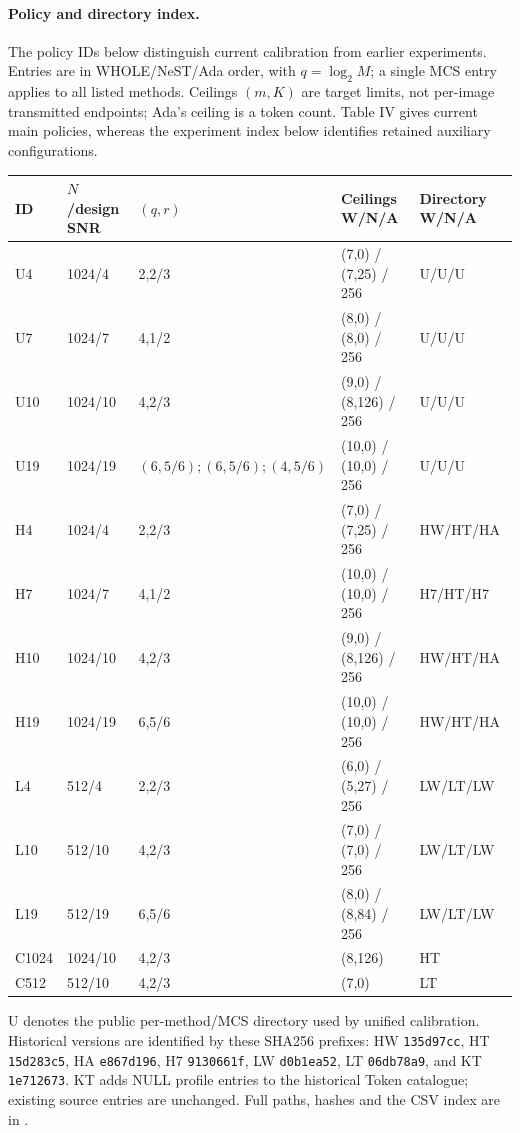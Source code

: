\documentclass[10pt,letterpaper]{article}
\begin{document}
\paragraph{Policy and directory index.}
The policy IDs below distinguish current calibration from earlier experiments. Entries are in WHOLE/NeST/Ada order, with $q=\log_2 M$; a single MCS entry applies to all listed methods. Ceilings $(m,K)$ are target limits, not per-image transmitted endpoints; Ada's ceiling is a token count. Table IV gives current main policies, whereas the experiment index below identifies retained auxiliary configurations.
\begin{longtable}{@{}lllp{4.3cm}l@{}}\toprule
ID & $N$/design SNR & $(q,r)$ & Ceilings W/N/A & Directory W/N/A\\\midrule\endhead
U4 & 1024/4 & 2,2/3 & (7,0) / (7,25) / 256 & U/U/U\\
U7 & 1024/7 & 4,1/2 & (8,0) / (8,0) / 256 & U/U/U\\
U10 & 1024/10 & 4,2/3 & (9,0) / (8,126) / 256 & U/U/U\\
U19 & 1024/19 & $(6,5/6);(6,5/6);(4,5/6)$ & (10,0) / (10,0) / 256 & U/U/U\\
H4 & 1024/4 & 2,2/3 & (7,0) / (7,25) / 256 & HW/HT/HA\\
H7 & 1024/7 & 4,1/2 & (10,0) / (10,0) / 256 & H7/HT/H7\\
H10 & 1024/10 & 4,2/3 & (9,0) / (8,126) / 256 & HW/HT/HA\\
H19 & 1024/19 & 6,5/6 & (10,0) / (10,0) / 256 & HW/HT/HA\\
L4 & 512/4 & 2,2/3 & (6,0) / (5,27) / 256 & LW/LT/LW\\
L10 & 512/10 & 4,2/3 & (7,0) / (7,0) / 256 & LW/LT/LW\\
L19 & 512/19 & 6,5/6 & (8,0) / (8,84) / 256 & LW/LT/LW\\
C1024 & 1024/10 & 4,2/3 & (8,126) & HT\\
C512 & 512/10 & 4,2/3 & (7,0) & LT\\
\bottomrule\end{longtable}
U denotes the public per-method/MCS directory used by unified calibration. Historical versions are identified by these SHA256 prefixes: HW \texttt{135d97cc}, HT \texttt{15d283c5}, HA \texttt{e867d196}, H7 \texttt{9130661f}, LW \texttt{d0b1ea52}, LT \texttt{06db78a9}, and KT \texttt{1e712673}. KT adds NULL profile entries to the historical Token catalogue; existing source entries are unchanged. Full paths, hashes and the CSV index are in .
\end{document}
